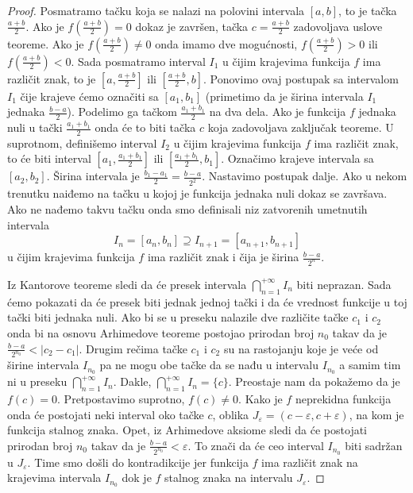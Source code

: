\documentclass[a4paper,12pt]{article}
\theoremstyle{plain}
\theoremstyle{definition}
\theoremstyle{remark}
\begin{document}
\begin{proof}
Posmatramo tačku koja se nalazi na polovini intervala $[a,b]$, to je tačka $\frac{a+b}{2}$. Ako je $f\left(\frac{a+b}{2}\right) = 0$ dokaz je završen, tačka $c = \frac{a+b}{2}$ zadovoljava uslove teoreme. Ako je $f\left(\frac{a+b}{2}\right) \neq 0$ onda imamo dve mogućnosti, $f\left(\frac{a+b}{2}\right) > 0$ ili $f\left(\frac{a+b}{2}\right) < 0$. Sada posmatramo interval $I_1$ u čijim krajevima funkcija $f$ ima različit znak, to je $[a, \frac{a+b}{2}]$ ili $[\frac{a+b}{2}, b]$. Ponovimo ovaj postupak sa intervalom $I_1$ čije krajeve ćemo označiti sa $[a_1,b_1]$ (primetimo da je širina intervala $I_1$ jednaka $\frac{b-a}{2}$). Podelimo ga tačkom $\frac{a_1+b_1}{2}$ na dva dela. Ako je funkcija $f$ jednaka nuli u tački $\frac{a_1+b_1}{2}$ onda će to biti tačka $c$ koja zadovoljava zaključak teoreme. U suprotnom, definišemo interval $I_2$ u čijim krajevima funkcija $f$ ima različit znak, to će biti interval $[a_1, \frac{a_1+b_1}{2}]$ ili $[\frac{a_1+b_1}{2}, b_1]$. Označimo krajeve intervala sa $[a_2,b_2]$. Širina intervala je $\frac{b_1-a_1}{2} = \frac{b-a}{2^2}$. Nastavimo postupak dalje. Ako u nekom trenutku naiđemo na tačku u kojoj je funkcija jednaka nuli dokaz se završava. Ako ne nađemo takvu tačku onda smo definisali niz zatvorenih umetnutih intervala
$$I_n = [a_n, b_n] \supseteq I_{n+1} = [a_{n+1}, b_{n+1}]$$
u čijim krajevima funkcija $f$ ima različit znak i čija je širina $\frac{b-a}{2^n}$.

Iz Kantorove teoreme sledi da će presek intervala $\bigcap_{n=1}^{+\infty} I_n$ biti neprazan. Sada ćemo pokazati da će presek biti jednak jednoj tački i da će vrednost funkcije u toj tački biti jednaka nuli. Ako bi se u preseku nalazile dve različite tačke $c_1$ i $c_2$ onda bi na osnovu Arhimedove teoreme postojao prirodan broj $n_0$ takav da je $\frac{b-a}{2^{n_0}} < |c_2 - c_1|$. Drugim rečima tačke $c_1$ i $c_2$ su na rastojanju koje je veće od širine intervala $I_{n_0}$ pa ne mogu obe tačke da se nađu u intervalu $I_{n_0}$ a samim tim ni u preseku $\bigcap_{n=1}^{+\infty} I_n$. Dakle, $\bigcap_{n=1}^{+\infty} I_n = \{c\}$. Preostaje nam da pokažemo da je $f(c) = 0$. Pretpostavimo suprotno, $f(c) \neq 0$. Kako je $f$ neprekidna funkcija onda će postojati neki interval oko tačke $c$, oblika $J_\varepsilon = (c - \varepsilon, c + \varepsilon)$, na kom je funkcija stalnog znaka. Opet, iz Arhimedove aksiome sledi da će postojati prirodan broj $n_0$ takav da je $\frac{b-a}{2^{n_0}} < \varepsilon$. To znači da će ceo interval $I_{n_0}$ biti sadržan u $J_\varepsilon$. Time smo došli do kontradikcije jer funkcija $f$ ima različit znak na krajevima intervala $I_{n_0}$ dok je $f$ stalnog znaka na intervalu $J_\varepsilon$.
\end{proof}
\end{document}
